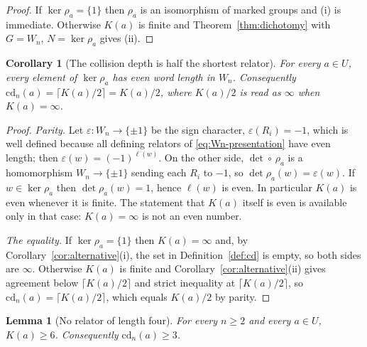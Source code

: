 \documentclass[11pt,a4paper]{article}
\newcommand{\cd}{\mathrm{cd}}
\newtheorem{lemma}[theorem]{Lemma}
\newtheorem{corollary}[theorem]{Corollary}
\theoremstyle{definition}
\theoremstyle{remark}
\theoremstyle{plain}
\begin{document}
\begin{proof}
If $\ker\rho_a=\{1\}$ then $\rho_a$ is an isomorphism of marked groups and (i) is immediate.
Otherwise $K(a)$ is finite and Theorem~\ref{thm:dichotomy} with $G=W_n$, $N=\ker\rho_a$ gives
(ii).
\end{proof}

\begin{corollary}[The collision depth is half the shortest relator]\label{cor:cd-is-K}
For every $a\in U$, every element of $\ker\rho_a$ has even word length in $W_n$. Consequently
$\cd_n(a)=\lceil K(a)/2\rceil=K(a)/2$, where $K(a)/2$ is read as $\infty$ when $K(a)=\infty$.
\end{corollary}

\begin{proof}
\emph{Parity.} Let $\varepsilon:W_n\to\{\pm1\}$ be the sign character,
$\varepsilon(R_i)=-1$, which is well defined because all defining relators of
\eqref{eq:Wn-presentation} have even length; then $\varepsilon(w)=(-1)^{\ell(w)}$. On the other
side, $\det\circ\,\rho_a$ is a homomorphism $W_n\to\{\pm1\}$ sending each $R_i$ to $-1$, so
$\det\rho_a(w)=\varepsilon(w)$. If $w\in\ker\rho_a$ then $\det\rho_a(w)=1$, hence $\ell(w)$ is
even. In particular $K(a)$ is even whenever it is finite. The statement that $K(a)$ itself is
even is available only in that case: $K(a)=\infty$ is not an even number.

\emph{The equality.} If $\ker\rho_a=\{1\}$ then $K(a)=\infty$ and, by
Corollary~\ref{cor:alternative}(i), the set in Definition~\ref{def:cd} is empty, so both sides
are $\infty$. Otherwise $K(a)$ is finite and Corollary~\ref{cor:alternative}(ii) gives
agreement below $\lceil K(a)/2\rceil$ and strict inequality at $\lceil K(a)/2\rceil$, so
$\cd_n(a)=\lceil K(a)/2\rceil$, which equals $K(a)/2$ by parity.
\end{proof}

\begin{lemma}[No relator of length four]\label{lem:no-length-four}
For every $n\ge2$ and every $a\in U$, $K(a)\ge6$. Consequently $\cd_n(a)\ge3$.
\end{lemma}
\end{document}

